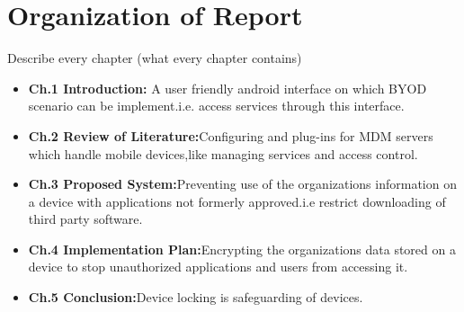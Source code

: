%
\section{Organization of Report}
\hspace{5mm} Describe every chapter (what every chapter contains)
\begin{itemize}
\item \textbf{Ch.1 Introduction:} A user friendly android interface on which BYOD scenario can be implement.i.e. access
services through this interface.
\item \textbf{Ch.2 Review of Literature:}Configuring and plug-ins for MDM servers which handle mobile devices,like managing
services and access control.
\item \textbf{Ch.3 Proposed System:}Preventing use of the organizations information on a device with applications not formerly
approved.i.e restrict downloading of third party software.
\item \textbf{Ch.4 Implementation Plan:}Encrypting the organizations data stored on a device to stop unauthorized applications
and users from accessing it.
\item \textbf{Ch.5 Conclusion:}Device locking is safeguarding of devices.

\end{itemize}
%
